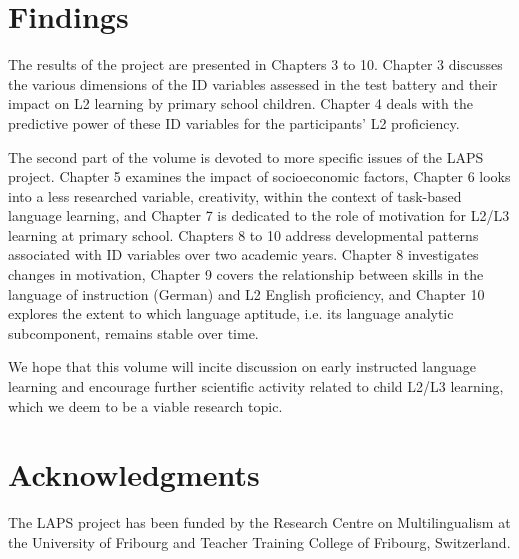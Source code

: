 \documentclass[output=paper]{langsci/langscibook}
\begin{document}
\section{Findings}\label{sec:intro:5}\largerpage

The results of the project are presented in Chapters 3 to 10. Chapter 3 discusses the various dimensions of the ID variables assessed in the test battery and their impact on L2 learning by primary school children. Chapter 4 deals with the predictive power of these ID variables for the participants’ L2 proficiency.

The second part of the volume is devoted to more specific issues of the LAPS project. Chapter 5 examines the impact of socioeconomic factors, Chapter 6 looks into a less researched variable, creativity, within the context of task-based language learning, and Chapter 7 is dedicated to the role of motivation for L2/L3 learning at primary school. Chapters 8 to 10 address developmental patterns associated with ID variables over two academic years. Chapter 8 investigates changes in motivation, Chapter 9 covers the relationship between skills in the language of instruction (German) and L2 English proficiency, and Chapter 10 explores the extent to which language aptitude, i.e. its language analytic subcomponent, remains stable over time.

We hope that this volume will incite discussion on early instructed language learning and encourage further scientific activity related to child L2/L3 learning, which we deem to be a viable research topic.

\section*{Acknowledgments}

The LAPS project has been funded by the Research Centre on Multilingualism at the University of Fribourg and Teacher Training College of Fribourg, Switzerland. 
\end{document}
